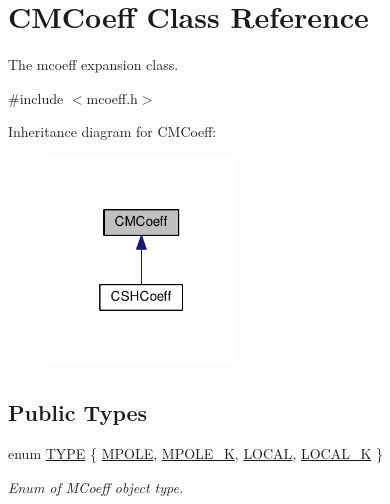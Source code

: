 \hypertarget{classCMCoeff}{\section{C\-M\-Coeff Class Reference}
\label{classCMCoeff}
}


The mcoeff expansion class.  




{\ttfamily \#include $<$mcoeff.\-h$>$}



Inheritance diagram for C\-M\-Coeff\-:\nopagebreak
\begin{figure}[H]
\begin{center}
\leavevmode
\includegraphics[width=140pt]{classCMCoeff__inherit__graph}
\end{center}
\end{figure}
\subsection*{Public Types}
\begin{DoxyCompactItemize}
\item 
enum \hyperlink{classCMCoeff_a0b490eeb5ba86bc1a95ea1c3b2946478}{T\-Y\-P\-E} \{ \hyperlink{classCMCoeff_a0b490eeb5ba86bc1a95ea1c3b2946478a44c2e68e32e879f210aab9493a0fb48d}{M\-P\-O\-L\-E}, 
\hyperlink{classCMCoeff_a0b490eeb5ba86bc1a95ea1c3b2946478a7620a298f37501509e3a5fec264f0c4f}{M\-P\-O\-L\-E\-\_\-\-K}, 
\hyperlink{classCMCoeff_a0b490eeb5ba86bc1a95ea1c3b2946478a3a2cae46474f6e8cd2151bb47b11002c}{L\-O\-C\-A\-L}, 
\hyperlink{classCMCoeff_a0b490eeb5ba86bc1a95ea1c3b2946478a518645c07b91ad17f9af6fa00ce5042a}{L\-O\-C\-A\-L\-\_\-\-K}
 \}
\begin{DoxyCompactList}\small\item\em Enum of M\-Coeff object type. \end{DoxyCompactList}\end{DoxyCompactItemize}

